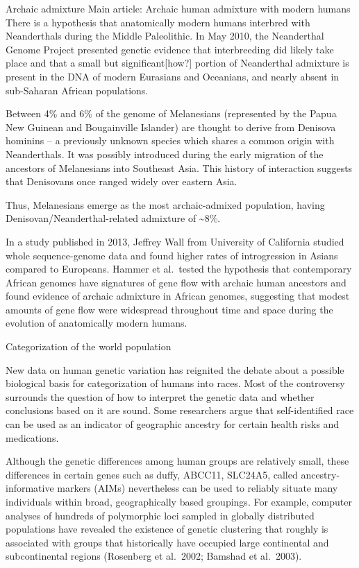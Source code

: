 Archaic admixture
Main article: Archaic human admixture with modern humans
There is a hypothesis that anatomically modern humans interbred with Neanderthals during the Middle Paleolithic. In May 2010, the Neanderthal Genome Project presented genetic evidence that interbreeding did likely take place and that a small but significant{[}how?{]} portion of Neanderthal admixture is present in the DNA of modern Eurasians and Oceanians, and nearly absent in sub-Saharan African populations.

Between 4\% and 6\% of the genome of Melanesians (represented by the Papua New Guinean and Bougainville Islander) are thought to derive from Denisova hominins -- a previously unknown species which shares a common origin with Neanderthals. It was possibly introduced during the early migration of the ancestors of Melanesians into Southeast Asia. This history of interaction suggests that Denisovans once ranged widely over eastern Asia.

Thus, Melanesians emerge as the most archaic-admixed population, having Denisovan/Neanderthal-related admixture of \textasciitilde{}8\%.

In a study published in 2013, Jeffrey Wall from University of California studied whole sequence-genome data and found higher rates of introgression in Asians compared to Europeans. Hammer et al.~tested the hypothesis that contemporary African genomes have signatures of gene flow with archaic human ancestors and found evidence of archaic admixture in African genomes, suggesting that modest amounts of gene flow were widespread throughout time and space during the evolution of anatomically modern humans.

Categorization of the world population

New data on human genetic variation has reignited the debate about a possible biological basis for categorization of humans into races. Most of the controversy surrounds the question of how to interpret the genetic data and whether conclusions based on it are sound. Some researchers argue that self-identified race can be used as an indicator of geographic ancestry for certain health risks and medications.

Although the genetic differences among human groups are relatively small, these differences in certain genes such as duffy, ABCC11, SLC24A5, called ancestry-informative markers (AIMs) nevertheless can be used to reliably situate many individuals within broad, geographically based groupings. For example, computer analyses of hundreds of polymorphic loci sampled in globally distributed populations have revealed the existence of genetic clustering that roughly is associated with groups that historically have occupied large continental and subcontinental regions (Rosenberg et al.~2002; Bamshad et al.~2003).

